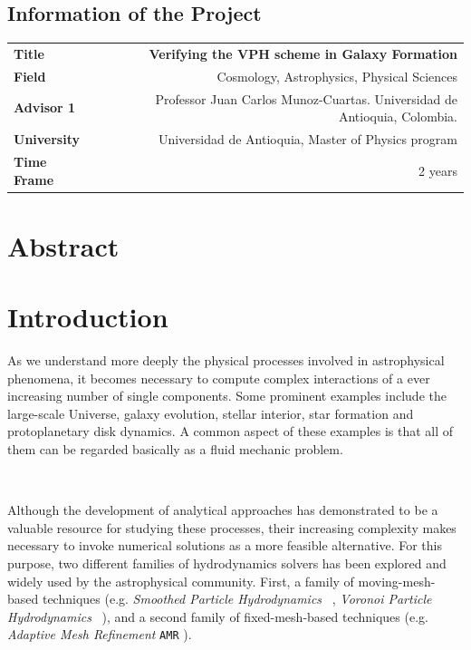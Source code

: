 \documentclass[a4,useAMS,usenatbib,usegraphicx,12pt]{article}
\begin{document}
\subsection*{Information of the Project}
\begin{tabular}{L!{\VRule}R}
\bf Title		& \bf Verifying the VPH scheme in Galaxy Formation\\
\bf Field		& Cosmology, Astrophysics, Physical Sciences \\
\bf Advisor 1	& Professor Juan Carlos Munoz-Cuartas. Universidad de Antioquia, Colombia.\\
\bf University	& Universidad de Antioquia, Master of Physics program \\
\bf Time Frame	& 2 years \\
\end{tabular}
\normalsize

\section{Abstract}
\newpage


\section{Introduction}
As we understand more deeply the physical processes involved in astrophysical 
phenomena, it becomes necessary to compute complex interactions of a ever 
increasing number of single components. Some prominent examples include 
the large-scale Universe, galaxy evolution, stellar interior, star formation 
and protoplanetary disk dynamics. A common aspect of these examples is that all 
of them can be regarded basically as a fluid mechanic problem.

\

Although the development of analytical approaches has demonstrated to be a
valuable resource for studying these processes, their increasing complexity 
makes necessary to invoke numerical solutions as a more feasible alternative. 
For this purpose, two different families of hydrodynamics solvers has been 
explored and widely used by the astrophysical community. First, a family of 
moving-mesh-based techniques (e.g. \textit{Smoothed Particle Hydrodynamics} 
\SPH\ \citep{Monaghan92}, \textit{Voronoi Particle Hydrodynamics} \VPH\ 
\citep{Hess10}), and a second family of fixed-mesh-based techniques (e.g.
\textit{Adaptive Mesh Refinement} \texttt{AMR} \citep{Berger89}).
\end{document}
